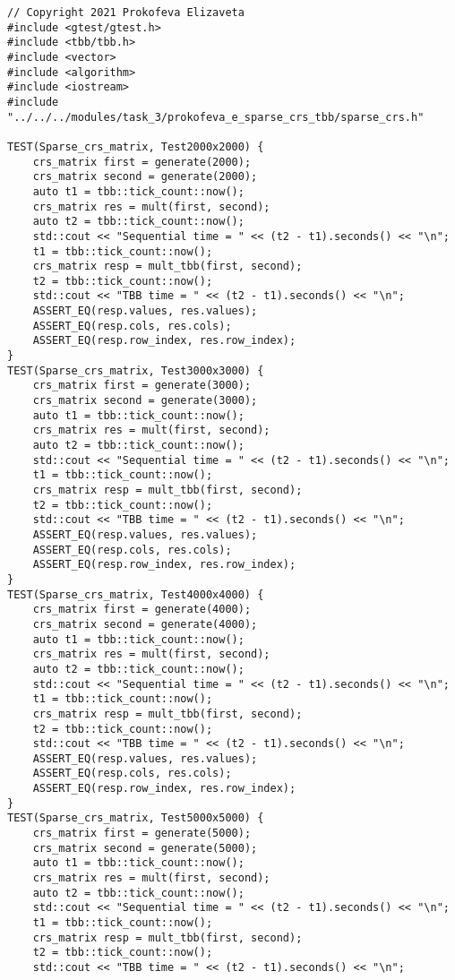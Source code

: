 \documentclass{report}
\begin{document}
\begin{lstlisting}
// Copyright 2021 Prokofeva Elizaveta
#include <gtest/gtest.h>
#include <tbb/tbb.h>
#include <vector>
#include <algorithm>
#include <iostream>
#include "../../../modules/task_3/prokofeva_e_sparse_crs_tbb/sparse_crs.h"

TEST(Sparse_crs_matrix, Test2000x2000) {
    crs_matrix first = generate(2000);
    crs_matrix second = generate(2000);
    auto t1 = tbb::tick_count::now();
    crs_matrix res = mult(first, second);
    auto t2 = tbb::tick_count::now();
    std::cout << "Sequential time = " << (t2 - t1).seconds() << "\n";
    t1 = tbb::tick_count::now();
    crs_matrix resp = mult_tbb(first, second);
    t2 = tbb::tick_count::now();
    std::cout << "TBB time = " << (t2 - t1).seconds() << "\n";
    ASSERT_EQ(resp.values, res.values);
    ASSERT_EQ(resp.cols, res.cols);
    ASSERT_EQ(resp.row_index, res.row_index);
}
TEST(Sparse_crs_matrix, Test3000x3000) {
    crs_matrix first = generate(3000);
    crs_matrix second = generate(3000);
    auto t1 = tbb::tick_count::now();
    crs_matrix res = mult(first, second);
    auto t2 = tbb::tick_count::now();
    std::cout << "Sequential time = " << (t2 - t1).seconds() << "\n";
    t1 = tbb::tick_count::now();
    crs_matrix resp = mult_tbb(first, second);
    t2 = tbb::tick_count::now();
    std::cout << "TBB time = " << (t2 - t1).seconds() << "\n";
    ASSERT_EQ(resp.values, res.values);
    ASSERT_EQ(resp.cols, res.cols);
    ASSERT_EQ(resp.row_index, res.row_index);
}
TEST(Sparse_crs_matrix, Test4000x4000) {
    crs_matrix first = generate(4000);
    crs_matrix second = generate(4000);
    auto t1 = tbb::tick_count::now();
    crs_matrix res = mult(first, second);
    auto t2 = tbb::tick_count::now();
    std::cout << "Sequential time = " << (t2 - t1).seconds() << "\n";
    t1 = tbb::tick_count::now();
    crs_matrix resp = mult_tbb(first, second);
    t2 = tbb::tick_count::now();
    std::cout << "TBB time = " << (t2 - t1).seconds() << "\n";
    ASSERT_EQ(resp.values, res.values);
    ASSERT_EQ(resp.cols, res.cols);
    ASSERT_EQ(resp.row_index, res.row_index);
}
TEST(Sparse_crs_matrix, Test5000x5000) {
    crs_matrix first = generate(5000);
    crs_matrix second = generate(5000);
    auto t1 = tbb::tick_count::now();
    crs_matrix res = mult(first, second);
    auto t2 = tbb::tick_count::now();
    std::cout << "Sequential time = " << (t2 - t1).seconds() << "\n";
    t1 = tbb::tick_count::now();
    crs_matrix resp = mult_tbb(first, second);
    t2 = tbb::tick_count::now();
    std::cout << "TBB time = " << (t2 - t1).seconds() << "\n";

\end{lstlisting}
\end{document}
